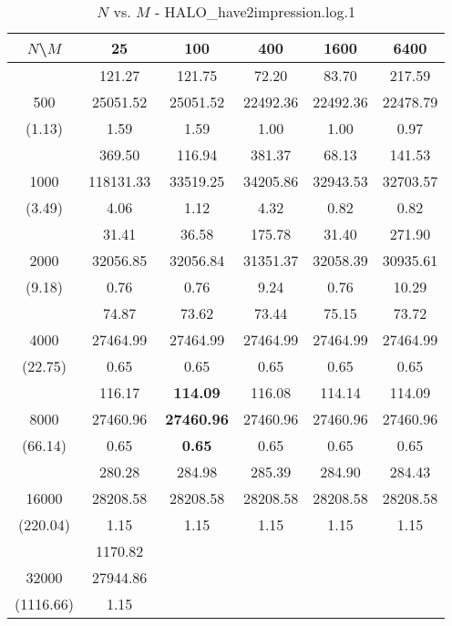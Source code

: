 \documentclass[conference]{IEEEtran}
\begin{document}
\begin{table}[th]
\caption{$N$ vs. $M$ - HALO\_have2impression.log.1}
\label{tab:HALO_have2impression.log.1}
\centering
\begin{tabular}{|c||c|c|c|c|c|}
\hline
$N$\textbackslash $M$ & 25 & 100 & 400 & 1600 & 6400 \\ \hline \hline
  & 121.27 & 121.75 & 72.20 & 83.70 & 217.59\\ 
500  & 25051.52 & 25051.52 & 22492.36 & 22492.36 & 22478.79\\ 
(1.13)  & 1.59 & 1.59 & 1.00 & 1.00 & 0.97\\ \hline 
  & 369.50 & 116.94 & 381.37 & 68.13 & 141.53\\ 
1000  & 118131.33 & 33519.25 & 34205.86 & 32943.53 & 32703.57\\ 
(3.49)  & 4.06 & 1.12 & 4.32 & 0.82 & 0.82\\ \hline 
  & 31.41 & 36.58 & 175.78 & 31.40 & 271.90\\ 
2000  & 32056.85 & 32056.84 & 31351.37 & 32058.39 & 30935.61\\ 
(9.18)  & 0.76 & 0.76 & 9.24 & 0.76 & 10.29\\ \hline 
  & 74.87 & 73.62 & 73.44 & 75.15 & 73.72\\ 
4000  & 27464.99 & 27464.99 & 27464.99 & 27464.99 & 27464.99\\ 
(22.75)  & 0.65 & 0.65 & 0.65 & 0.65 & 0.65\\ \hline 
  & 116.17 & {\bf 114.09} & 116.08 & 114.14 & 114.09\\ 
8000  & 27460.96 & {\bf 27460.96} & 27460.96 & 27460.96 & 27460.96\\ 
(66.14)  & 0.65 & {\bf 0.65} & 0.65 & 0.65 & 0.65\\ \hline 
  & 280.28 & 284.98 & 285.39 & 284.90 & 284.43\\ 
16000  & 28208.58 & 28208.58 & 28208.58 & 28208.58 & 28208.58\\ 
(220.04)  & 1.15 & 1.15 & 1.15 & 1.15 & 1.15\\ \hline 
  & 1170.82 &  &  &  & \\ 
32000  & 27944.86 &  &  &  & \\ 
(1116.66)  & 1.15 &  &  &  & \\ \hline 
\end{tabular}
\end{table}
\end{document}
